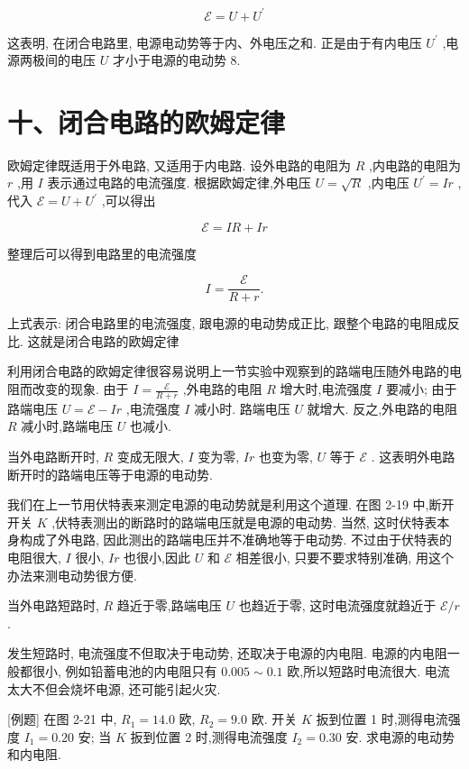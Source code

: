 \documentclass[10pt]{article}
\begin{document}
\[
\mathcal{E} = U + {U}^{\prime }
\]

这表明, 在闭合电路里, 电源电动势等于内、外电压之和. 正是由于有内电压 \({U}^{\prime }\) ,电源两极间的电压 \(U\) 才小于电源的电动势 8.

\section*{十、闭合电路的欧姆定律}

欧姆定律既适用于外电路, 又适用于内电路. 设外电路的电阻为 \(R\) ,内电路的电阻为 \(r\) ,用 \(I\) 表示通过电路的电流强度. 根据欧姆定律,外电压 \(U = \sqrt{R}\) ,内电压 \({U}^{\prime } = {Ir}\) ,代入 \(\mathcal{E} = U + {U}^{\prime }\) ,可以得出

\[
\mathcal{E} = {IR} + {Ir}
\]

整理后可以得到电路里的电流强度

\[
I = \frac{\mathcal{E}}{R + r}.
\]

上式表示: 闭合电路里的电流强度, 跟电源的电动势成正比, 跟整个电路的电阻成反比. 这就是闭合电路的欧姆定律

利用闭合电路的欧姆定律很容易说明上一节实验中观察到的路端电压随外电路的电阻而改变的现象. 由于 \(I = \frac{\mathcal{E}}{R + r}\) ,外电路的电阻 \(R\) 增大时,电流强度 \(I\) 要减小; 由于路端电压 \(U = \mathcal{E} - {Ir}\) ,电流强度 \(I\) 减小时. 路端电压 \(U\) 就增大. 反之,外电路的电阻 \(R\) 减小时,路端电压 \(U\) 也减小.

当外电路断开时, \(R\) 变成无限大, \(I\) 变为零, \({Ir}\) 也变为零, \(U\) 等于 \(\mathcal{E}\) . 这表明外电路断开时的路端电压等于电源的电动势.

我们在上一节用伏特表来测定电源的电动势就是利用这个道理. 在图 2-19 中,断开开关 \(K\) ,伏特表测出的断路时的路端电压就是电源的电动势. 当然, 这时伏特表本身构成了外电路, 因此测出的路端电压并不准确地等于电动势. 不过由于伏特表的电阻很大, \(I\) 很小, \({Ir}\) 也很小,因此 \(U\) 和 \(\mathcal{E}\) 相差很小, 只要不要求特别准确, 用这个办法来测电动势很方便.

当外电路短路时, \(R\) 趋近于零,路端电压 \(U\) 也趋近于零, 这时电流强度就趋近于 \(\mathcal{E}/r\) .

发生短路时, 电流强度不但取决于电动势, 还取决于电源的内电阻. 电源的内电阻一般都很小, 例如铅蓄电池的内电阻只有 \({0.005} \sim {0.1}\) 欧,所以短路时电流很大. 电流太大不但会烧坏电源, 还可能引起火灾.

[例题] 在图 2-21 中, \({R}_{1} = {14.0}\) 欧, \({R}_{2} = {9.0}\) 欧. 开关 \(K\) 扳到位置 1 时,测得电流强度 \({I}_{1} = {0.20}\) 安; 当 \(K\) 扳到位置 2 时,测得电流强度 \({I}_{2} = {0.30}\) 安. 求电源的电动势和内电阻.
\end{document}
